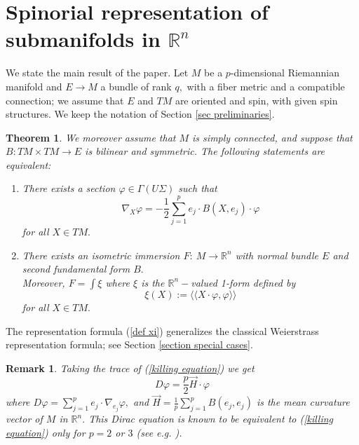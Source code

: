 \documentclass{amsart}
\newtheorem{thm}{Theorem}
\newtheorem{rem}{Remark}
\begin{document}
\section{Spinorial representation of submanifolds in ${\mathbb{R}}^n$}
We state the main result of the paper. Let $M$ be a $p$-dimensional Riemannian manifold and $E\rightarrow M$ a bundle of rank $q,$ with a fiber metric and a compatible connection; we assume that $E$ and $TM$ are oriented and spin, with given spin structures. We keep the notation of Section \ref{sec preliminaries}.
\begin{thm}\label{thm main result}
We moreover assume that $M$ is simply connected, and suppose that $B:TM\times TM\rightarrow E$ is bilinear and symmetric. The following statements are equivalent:
\begin{enumerate}
\item There exists a section $\varphi\in\Gamma(U\Sigma)$ such that
\begin{equation}\label{killing equation}
\nabla_X\varphi=-\frac{1}{2}\sum_{j=1}^pe_j\cdot B(X,e_j)\cdot\varphi
\end{equation}
for all $X\in TM.$
\item There exists an isometric immersion $F:\ M\rightarrow {\mathbb{R}}^n$ with normal bundle $E$ and second fundamental form $B.$\\
Moreover, $F=\int\xi$ where $\xi$ is the ${\mathbb{R}}^n-$valued 1-form defined by
\begin{equation}\label{def xi}
\xi(X):=\langle\langle X\cdot\varphi,\varphi\rangle\rangle
\end{equation}
for all $X\in TM.$
\end{enumerate}
\end{thm}
The representation formula (\ref{def xi}) generalizes the classical Weierstrass representation formula; see Section \ref{section special cases}. 
\begin{rem}
Taking the trace of (\ref{killing equation}) we get
\begin{equation*}
D\varphi=\frac{p}{2}\vec{H}\cdot\varphi
\end{equation*}
where $D\varphi=\sum_{j=1}^pe_j\cdot\nabla_{e_j}\varphi,$ and $\vec{H}=\frac{1}{p}\sum_{j=1}^pB(e_j,e_j)$ is the mean curvature vector of $M$ in ${\mathbb{R}}^n.$ This Dirac equation is known to be equivalent to (\ref{killing equation}) only for $p=2$ or $3$ (see e.g. \cite{Fr,LR1,LR2,BLR}).
\end{rem}
\end{document}
